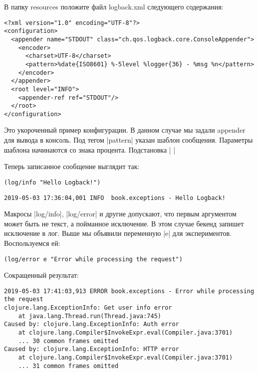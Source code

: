 В папку resources положите файл logback.xml следующего содержания:

\begin{verbatim}
<?xml version="1.0" encoding="UTF-8"?>
<configuration>
  <appender name="STDOUT" class="ch.qos.logback.core.ConsoleAppender">
    <encoder>
      <charset>UTF-8</charset>
      <pattern>%date{ISO8601} %-5level %logger{36} - %msg %n</pattern>
    </encoder>
  </appender>
  <root level="INFO">
    <appender-ref ref="STDOUT"/>
  </root>
</configuration>
\end{verbatim}

Это укороченный пример конфигурации. В данном случае мы задали appender для
вывода в консоль. Под тегом \spverb|pattern| указан шаблон сообщения. Параметры шаблона
начинаются со знака процента. Подстановка \spverb|%
\spverb|%

Теперь записанное сообщение выглядит так:

\begin{verbatim}
(log/info "Hello Logback!")
\end{verbatim}

\begin{verbatim}
2019-05-03 17:36:04,001 INFO  book.exceptions - Hello Logback!
\end{verbatim}

Макросы \spverb|log/info|, \spverb|log/error| и другие допускают, что первым аргументом может
быть не текст, а пойманное исключение. В этом случае бекенд запишет исключение в
лог. Выше мы объявили переменную \spverb|e| для экспериментов. Воспользуемся ей:

\begin{verbatim}
(log/error e "Error while processing the request")
\end{verbatim}

Сокращенный результат:

\begin{verbatim}
2019-05-03 17:41:03,913 ERROR book.exceptions - Error while processing the request
clojure.lang.ExceptionInfo: Get user info error
	at java.lang.Thread.run(Thread.java:745)
Caused by: clojure.lang.ExceptionInfo: Auth error
	at clojure.lang.Compiler$InvokeExpr.eval(Compiler.java:3701)
	... 30 common frames omitted
Caused by: clojure.lang.ExceptionInfo: HTTP error
	at clojure.lang.Compiler$InvokeExpr.eval(Compiler.java:3701)
	... 31 common frames omitted
\end{verbatim}


